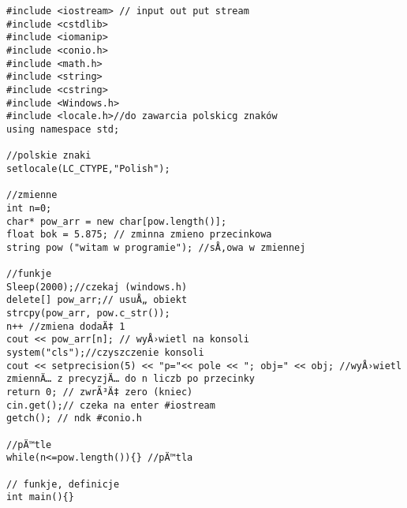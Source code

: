 \documentclass{article}
\begin{document}
\begin{verbatim}
#include <iostream> // input out put stream
#include <cstdlib>
#include <iomanip>
#include <conio.h>
#include <math.h>
#include <string>
#include <cstring>
#include <Windows.h>
#include <locale.h>//do zawarcia polskicg znaków
using namespace std;

//polskie znaki 
setlocale(LC_CTYPE,"Polish");

//zmienne
int n=0;
char* pow_arr = new char[pow.length()];
float bok = 5.875; // zminna zmieno przecinkowa
string pow ("witam w programie"); //sÅ‚owa w zmiennej

//funkje
Sleep(2000);//czekaj (windows.h)
delete[] pow_arr;// usuÅ„ obiekt
strcpy(pow_arr, pow.c_str());
n++ //zmiena dodaÄ‡ 1  
cout << pow_arr[n]; // wyÅ›wietl na konsoli
system("cls");//czyszczenie konsoli
cout << setprecision(5) << "p="<< pole << "; obj=" << obj; //wyÅ›wietl zmiennÄ… z precyzjÄ… do n liczb po przecinky
return 0; // zwrÃ³Ä‡ zero (kniec)
cin.get();// czeka na enter #iostream
getch(); // ndk #conio.h

//pÄ™tle
while(n<=pow.length()){} //pÄ™tla 

// funkje, definicje
int main(){}
\end{verbatim}
\end{document}
